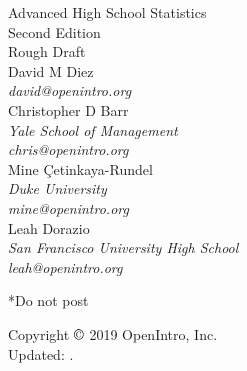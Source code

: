 \begin{center}
{\huge{ Advanced High School Statistics\vspace{10mm} \\  
Second Edition\vspace{10mm}  \\
 Rough Draft  \vspace{10mm} }}\\
{David M Diez \\
\small\emph{david@openintro.org} \\
\vspace{6mm}%
Christopher D Barr \\
\small\emph{Yale School of Management} \\
\small\emph{chris@openintro.org} \\
\vspace{6mm}%
Mine \c{C}etinkaya-Rundel \\
\small\emph{Duke University} \\
\small\emph{mine@openintro.org} \\
\vspace{6mm}%
Leah Dorazio \\
\small\emph{San Francisco University High School}\\
\small\emph{leah@openintro.org}}

\end{center}
\vfil{}
{\huge{*Do not post}\vspace{10mm} }



\noindent Copyright $\copyright$ 2019 OpenIntro, Inc.  \\
Updated: \versiondate. \\

